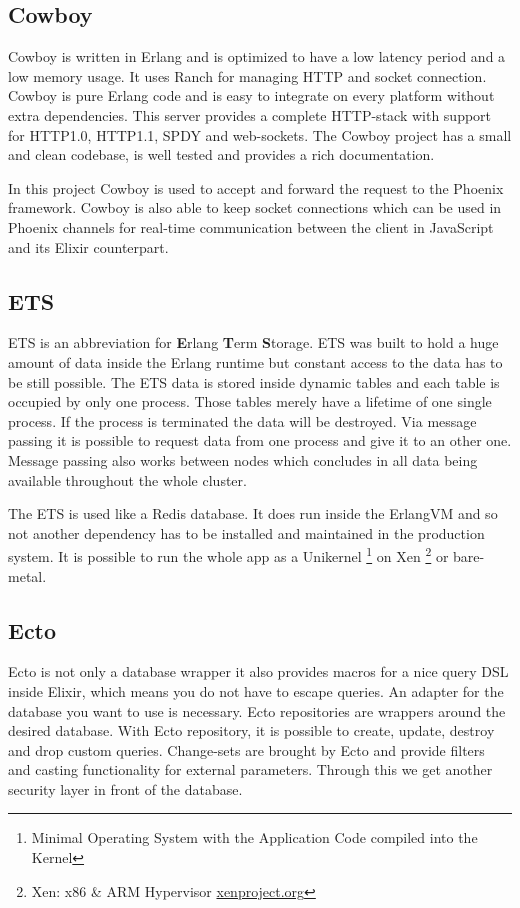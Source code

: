 \subsection{Cowboy}
Cowboy is written in Erlang and is optimized to have a low latency period and a low memory usage. It uses Ranch for managing HTTP and socket connection. Cowboy is pure Erlang code and is easy to integrate on every platform without extra dependencies. This server provides a complete HTTP-stack with support for HTTP1.0, HTTP1.1, SPDY and web-sockets. The Cowboy project has a small and clean codebase, is well tested and provides a rich documentation.

\textcolor{newcode}{In this project Cowboy is used to accept and forward the request to the Phoenix framework. Cowboy is also able to keep socket connections which can be used in Phoenix channels for real-time communication between the client in JavaScript and its Elixir counterpart.}

\subsection{ETS}
ETS is an abbreviation for \textbf{E}rlang \textbf{T}erm \textbf{S}torage. ETS was built to hold a huge amount of data inside the Erlang runtime but constant access to the data has to be still possible. The ETS data is stored inside dynamic tables and each table is occupied by only one process. Those tables merely have a lifetime of one single process. If the process is terminated the data will be destroyed. Via message passing it is possible to request data from one process and give it to an other one. Message passing also works between nodes which concludes in all data being available throughout the whole cluster. 

\textcolor{newcode}{The ETS is used like a Redis database. It does run inside the ErlangVM and so not another dependency has to be installed  and maintained in the production system. It is possible to run the whole app as a Unikernel  \footnote{Minimal Operating System with the Application Code compiled into the Kernel} on Xen \footnote{Xen: x86 \& ARM Hypervisor \url{xenproject.org}} or bare-metal.}

\subsection{Ecto}
Ecto is not only a database wrapper it also provides macros for a nice query DSL inside Elixir, which means you do not have to escape queries. An adapter for the database you want to use is necessary. Ecto repositories are wrappers around the desired database. With Ecto repository, it is possible to create, update, destroy and drop custom queries.  Change-sets are brought by Ecto and provide filters and casting functionality for external parameters. Through this we get another security layer in front of the database.

